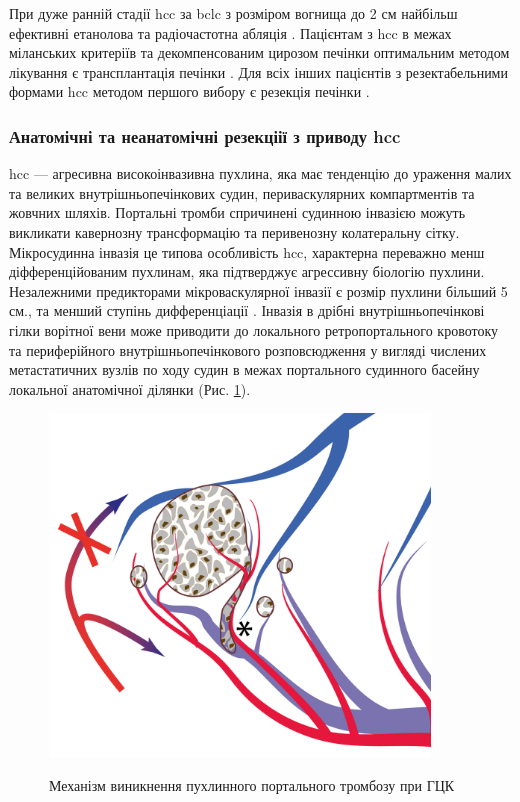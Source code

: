 \begin{refsection}
При дуже ранній стадії \acrshort{hcc} за \acrshort{bclc} з розміром вогнища до 2 см найбільш ефективні етанолова та радіочастотна абляція  \cite{Cucchetti2013}. Пацієнтам з \acrshort{hcc} в межах міланських критеріїв та декомпенсованим цирозом печінки оптимальним методом лікування є трансплантація печінки \cite{Colombo2016}. Для всіх інших пацієнтів з резектабельними формами \acrshort{hcc} методом першого вибору є резекція печінки \cite{Heimbach2018, Kudo2011}. 

\subsubsection{Анатомічні та неанатомічні резекціії з приводу \acrshort{hcc}}

\acrshort{hcc} --- агресивна високоінвазивна пухлина, яка має тенденцію до ураження малих та великих внутрішньопечінкових судин, периваскулярних компартментів та жовчних шляхів. Портальні тромби спричинені судинною інвазією можуть викликати кавернозну трансформацію та перивенозну колатеральну сітку. Мікросудинна інвазія це типова особливість \acrshort{hcc}, характерна переважно менш діфференційованим пухлинам, яка підтверджує агрессивну біологію пухлини. Незалежними предикторами мікроваскулярної інвазії є розмір пухлини більший 5 см., та менший ступінь дифференціації \cite{Zimmermann2017}. Інвазія в дрібні внутрішньопечінкові гілки ворітної вени може приводити до локального ретропортального кровотоку та периферійного внутрішньопечінкового розповсюдження у вигляді числених метастатичних вузлів по ходу судин в межах портального судинного басейну локальної анатомічної ділянки (Рис. \ref{fig:HCC_vascular_invasion}). 


\begin{figure}[htbp]
\caption{Механізм виникнення пухлинного портального тромбозу при ГЦК}
\includegraphics[width=0.9\textwidth]{Illustrations/Chapter_01/HCC_vascular_invasion.png}
\label{fig:HCC_vascular_invasion}


\end{figure}
\end{refsection}
